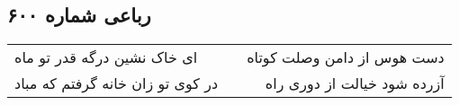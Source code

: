 \begin{center}
\section*{رباعی شماره ۶۰۰}
\label{sec:sh600}
\begin{longtable}{l p{0.5cm} r}
ای خاک نشین درگه قدر تو ماه
&&
دست هوس از دامن وصلت کوتاه
\\
در کوی تو زان خانه گرفتم که مباد
&&
آزرده شود خیالت از دوری راه
\\
\end{longtable}
\end{center}
